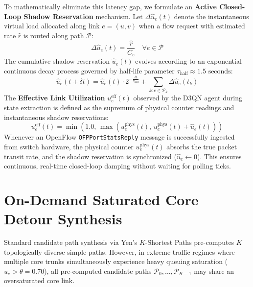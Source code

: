 \documentclass[12pt,a4paper,oneside]{report}
\begin{document}
To mathematically eliminate this latency gap, we formulate an \textbf{Active Closed-Loop Shadow Reservation} mechanism. Let $\Delta \hat{u}_e(t)$ denote the instantaneous virtual load allocated along link $e = (u, v)$ when a flow request with estimated rate $\hat{r}$ is routed along path $\mathcal{P}$:
\begin{equation}
    \Delta \hat{u}_e(t) = \frac{\hat{r}}{C_e} \quad \forall e \in \mathcal{P}
\end{equation}
The cumulative shadow reservation $\hat{u}_e(t)$ evolves according to an exponential continuous decay process governed by half-life parameter $\tau_{\text{half}} \approx 1.5\text{ seconds}$:
\begin{equation}
    \hat{u}_e(t + \delta t) = \hat{u}_e(t) \cdot 2^{-\frac{\delta t}{\tau_{\text{half}}}} + \sum_{k: e \in \mathcal{P}_k} \Delta \hat{u}_e(t_k)
\end{equation}
The \textbf{Effective Link Utilization} $u_e^{\text{eff}}(t)$ observed by the D3QN agent during state extraction is defined as the supremum of physical counter readings and instantaneous shadow reservations:
\begin{equation}
    u_e^{\text{eff}}(t) = \min\left(1.0, \, \max\left( u_e^{\text{phys}}(t), \, u_e^{\text{phys}}(t) + \hat{u}_e(t) \right)\right)
\end{equation}
Whenever an OpenFlow \texttt{OFPPortStatsReply} message is successfully ingested from switch hardware, the physical counter $u_e^{\text{phys}}(t)$ absorbs the true packet transit rate, and the shadow reservation is synchronized ($\hat{u}_e \leftarrow 0$). This ensures continuous, real-time closed-loop damping without waiting for polling ticks.

\section{On-Demand Saturated Core Detour Synthesis}
\label{sec:ondemand_detour_math}
Standard candidate path synthesis via Yen's $K$-Shortest Paths pre-computes $K$ topologically diverse simple paths. However, in extreme traffic regimes where multiple core trunks simultaneously experience heavy queuing saturation ($u_e > \theta = 0.70$), all pre-computed candidate paths $\mathcal{P}_0, \dots, \mathcal{P}_{K-1}$ may share an oversaturated core link.
\end{document}
